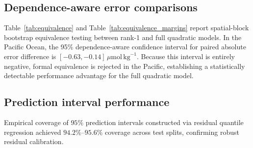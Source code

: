 \subsection{Dependence-aware error comparisons}
Table~\ref{tab:equivalence} and Table~\ref{tab:equivalence_margins} report spatial-block bootstrap equivalence testing between rank-1 and full quadratic models. In the Pacific Ocean, the 95\% dependence-aware confidence interval for paired absolute error difference is $[-0.63, -0.14]\,\mu\mathrm{mol}\,\mathrm{kg}^{-1}$. Because this interval is entirely negative, formal equivalence is rejected in the Pacific, establishing a statistically detectable performance advantage for the full quadratic model.




\subsection{Prediction interval performance}
Empirical coverage of $95\%$ prediction intervals constructed via residual quantile regression achieved $94.2\%$--$95.6\%$ coverage across test splits, confirming robust residual calibration.
